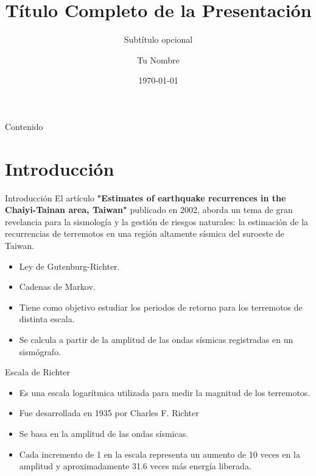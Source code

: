 \documentclass[12pt]{beamer}
\title[Mi Presentación]{Título Completo de la Presentación}
\subtitle{Subtítulo opcional}
\author{Tu Nombre}
\institute{Tu Institución}
\date{\today} %
\begin{document}
\begin{frame}
  \titlepage
\end{frame}

\begin{frame}{Contenido}
  \tableofcontents
\end{frame}

\section{Introducción}
\begin{frame}{Introducción}
  El artículo \textbf{"Estimates of earthquake recurrences in the Chaiyi-Tainan area,  Taiwan"} publicado en 2002, aborda un tema de gran revelancia 
  para la sismología y la gestión de riesgos naturales: la estimación de la recurrencias de terremotos en una región altamente sísmica del suroeste de Taiwan.
\end{frame}

\begin{frame}
    \begin{itemize}
        \item Ley de Gutenburg-Richter.
        \item Cadenas de Markov.
        \item Tiene como objetivo estudiar los periodos de  retorno para los terremotos de distinta escala.
        \item Se calcula a partir de la amplitud de las ondas sísmicas registradas en un sismógrafo.
    \end{itemize}
\end{frame}

\begin{frame}{Escala de Richter}
    \begin{itemize}
        \item Es una escala logarítmica utilizada para medir la magnitud de los terremotos.
        \item Fue desarrollada en 1935 por Charles F. Richter
        \item Se basa en la amplitud de las ondas sísmicas.
        \item Cada incremento de 1 en la escala representa un aumento de 10 veces en la amplitud y aproximadamente 31.6 veces más energía liberada.
    \end{itemize}
\end{frame}
\end{document}
